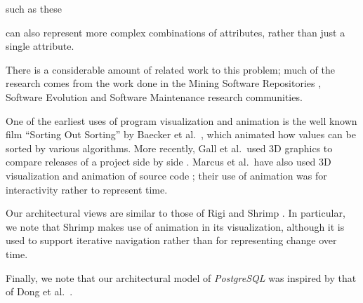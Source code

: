 \documentclass[times, 10pt,twocolumn]{article}
\newcommand{\postgresql}{\emph{PostgreSQL}\xspace}
\begin{document}
such as these

can also represent more complex combinations of attributes,
rather than just a single attribute.  





There is a considerable amount of related work to this problem; much of the
research comes from the work done in the Mining Software Repositories
\cite{church04}, Software Evolution and Software Maintenance
\cite{software-mining} research communities.

One of the earliest uses of program visualization and animation is the well
known film ``Sorting Out Sorting'' by Baecker et al.\ \cite{sortingout},
which animated how values can be sorted by various algorithms.  More
recently, Gall et al.\ used 3D graphics to compare releases of a project
side by side \cite{GallJR99}.  Marcus et al.\ have also used 3D
visualization and animation of source code \cite{maletic}; their use of
animation was for interactivity rather to represent time.

Our architectural views are similar to those of Rigi \cite{rigi} and Shrimp
\cite{shrimp}.  In particular, we note that Shrimp makes use of animation
in its visualization, although it is used to support iterative navigation
rather than for representing change over time.




Finally, we note that our architectural model of \postgresql was 
inspired by 
that of Dong et al.\ \cite{dong}.
\end{document}
